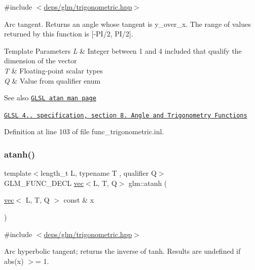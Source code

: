 {\ttfamily \#include $<$\hyperlink{trigonometric_8hpp}{deps/glm/trigonometric.\+hpp}$>$}

Arc tangent. Returns an angle whose tangent is y\+\_\+over\+\_\+x. The range of values returned by this function is \mbox{[}-\/\+P\+I/2, P\+I/2\mbox{]}.


\begin{DoxyTemplParams}{Template Parameters}
{\em L} & Integer between 1 and 4 included that qualify the dimension of the vector \\
\hline
{\em T} & Floating-\/point scalar types \\
\hline
{\em Q} & Value from qualifier enum\\
\hline
\end{DoxyTemplParams}
\begin{DoxySeeAlso}{See also}
\href{http://www.opengl.org/sdk/docs/manglsl/xhtml/atan.xml}{\tt G\+L\+SL atan man page} 

\href{http://www.opengl.org/registry/doc/GLSLangSpec.4.20.8.pdf}{\tt G\+L\+SL 4.. specification, section 8. Angle and Trigonometry Functions} 
\end{DoxySeeAlso}


Definition at line 103 of file func\+\_\+trigonometric.\+inl.

\mbox{\label{group__core__func__trigonometric_gabc925650e618357d07da255531658b87}} 
\subsubsection{\texorpdfstring{atanh()}{atanh()}}
{\footnotesize\ttfamily template$<$length\+\_\+t L, typename T , qualifier Q$>$ \\
G\+L\+M\+\_\+\+F\+U\+N\+C\+\_\+\+D\+E\+CL \hyperlink{structglm_1_1vec}{vec}$<$L, T, Q$>$ glm\+::atanh (\begin{DoxyParamCaption}\item[{\hyperlink{structglm_1_1vec}{vec}$<$ L, T, Q $>$ const \&}]{x }\end{DoxyParamCaption})}



{\ttfamily \#include $<$\hyperlink{trigonometric_8hpp}{deps/glm/trigonometric.\+hpp}$>$}

Arc hyperbolic tangent; returns the inverse of tanh. Results are undefined if abs(x) $>$= 1.


